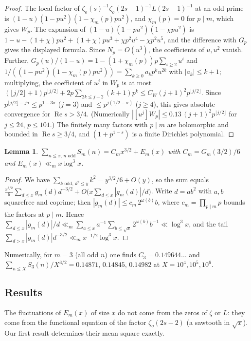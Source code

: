 \documentclass[11pt]{amsart}
\newtheorem{lemma}{Lemma}
\theoremstyle{remark}
\newcommand{\zo}{\zeta_{o}}
\begin{document}
\begin{proof}
The local factor of $\zo(s)^{-1}\zo(2s-1)^{-1}L(2s-1)^{-1}$ at an odd prime is $(1-u)(1-pu^2)(1-\chi_m(p)pu^2)$, and $\chi_m(p)=0$ for $p\mid m$, which gives $W_p$. The expansion of $(1-u)(1-pu^2)(1-\chi pu^2)$ is $1-u-(1+\chi)pu^2+(1+\chi)pu^3+\chi p^2u^4-\chi p^2u^5$, and the difference with $G_p$ gives the displayed formula. Since $N_p=O(u^3)$, the coefficients of $u,u^2$ vanish. Further, $G_p(u)/(1-u)=1-(1+\chi_m(p))p\sum_{i\ge2}u^i$ and $1/((1-pu^2)(1-\chi_m(p)pu^2))=\sum_{k\ge0}a_kp^ku^{2k}$ with $|a_k|\le k+1$; multiplying, the coefficient of $u^j$ in $W_p$ is at most $(\lfloor j/2\rfloor+1)p^{\lfloor j/2\rfloor}+2p\sum_{2k\le j-2}(k+1)p^k\le C_W(j+1)^2p^{\lfloor j/2\rfloor}$. Since $p^{\lfloor j/2\rfloor-j\sigma}\le p^{1-3\sigma}$ ($j=3$) and $\le p^{j(1/2-\sigma)}$ ($j\ge4$), this gives absolute convergence for $\operatorname{Re}s>3/4$. (Numerically $|[u^j]W_p|\le0.13\,(j+1)^2p^{\lfloor j/2\rfloor}$ for $j\le24$, $p\le101$.) The finitely many factors with $p\mid m$ are holomorphic and bounded in $\operatorname{Re}s\ge3/4$, and $(1+p^{1-s})$ is a finite Dirichlet polynomial.
\end{proof}

\begin{lemma}\label{lem:main}
$\sum_{n\le x,\,n\text{ odd}}S_m(n)=C_mx^{3/2}+E_m(x)$ with $C_m=G_m(3/2)/6$ and $E_m(x)\ll_m x\log^3x$.
\end{lemma}

\begin{proof}
We have $\sum_{k\text{ odd},\,k^2\le y}k^2=y^{3/2}/6+O(y)$, so the sum equals $\frac{x^{3/2}}6\sum_{d\le x}g_m(d)d^{-3/2}+O\big(x\sum_{d\le x}|g_m(d)|/d\big)$. Write $d=ab^2$ with $a,b$ squarefree and coprime; then $|g_m(d)|\le c_m\,2^{\omega(b)}b$, where $c_m=\prod_{p\mid m}p$ bounds the factors at $p\mid m$. Hence $\sum_{d\le x}|g_m(d)|/d\ll_m\sum_{a\le x}a^{-1}\sum_{b\le\sqrt x}2^{\omega(b)}b^{-1}\ll\log^3x$, and the tail $\sum_{d>x}|g_m(d)|d^{-3/2}\ll_m x^{-1/2}\log^3x$.
\end{proof}

Numerically, for $m=3$ (all odd $n$) one finds $C_3=0.149644\ldots$ and $\sum_{n\le X}S_3(n)/X^{3/2}=0.14871,\,0.14845,\,0.14982$ at $X=10^4,10^5,10^6$.


\subsection*{Results}
The fluctuations of $E_m(x)$ of size $x$ do not come from the zeros of $\zeta$ or $L$: they come from the functional equation of the factor $\zo(2s-2)$ (a sawtooth in $\sqrt{x}$). Our first result determines their mean square exactly.
\end{document}

